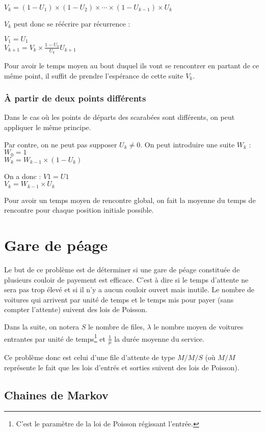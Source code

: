 \documentclass{scrartcl}
\begin{document}
      $V_k = (1 - U_1) \times (1 - U_2) \times \cdots \times (1 - U_{k - 1})
      \times U_k$

      $V_k$ peut donc se réécrire par récurrence :

      $V_1 = U_1$ \\
      $V_{k + 1} = V_k \times \frac{1 - U_k}{U_k}U_{k + 1}$

      Pour avoir le temps moyen au bout duquel ils vont se rencontrer en
      partant de ce même point, il suffit de prendre l'espérance de cette suite
      $V_k$.

    \subsubsection{À partir de deux points différents}
      Dans le cas où les points de départs des scarabées sont différents, on peut
      appliquer le même principe.

      Par contre, on ne peut pas supposer $U_k \neq 0$.
      On peut introduire une suite $W_k$ :
      $W_0 = 1$ \\
      $W_k = W_{k-1} \times (1 - U_k)$

      On a donc :
      $V1 = U1$ \\
      $V_k = W_{k-1} \times U_k$

      Pour avoir un temps moyen de rencontre global, on fait la moyenne du temps
      de rencontre pour chaque position initiale possible.

\section{Gare de péage}
  Le but de ce problème est de déterminer si une gare de péage constituée de
  plusieurs couloir de payement est efficace. C'est à dire si le temps
  d'attente ne sera pas trop élevé et si il n'y a aucun couloir ouvert mais
  inutile. Le nombre de voitures qui arrivent par unité de temps et le temps
  mis pour payer (sans compter l'attente) suivent des lois de Poisson.

  Dans la suite, on notera $S$ le nombre de files, $\lambda$ le nombre moyen de
  voitures entrantes par unité de temps\footnote{C'est le paramètre de la loi
  de Poisson régissant l'entrée.} et $\frac 1 \mu$ la durée moyenne du service.

  Ce problème donc est celui d'une file d'attente de type $M/M/S$ (où $M/M$
  représente le fait que les lois d'entrés et sorties suivent des lois de
  Poisson).

  \subsection{Chaines de Markov}
    
  
\end{document}
